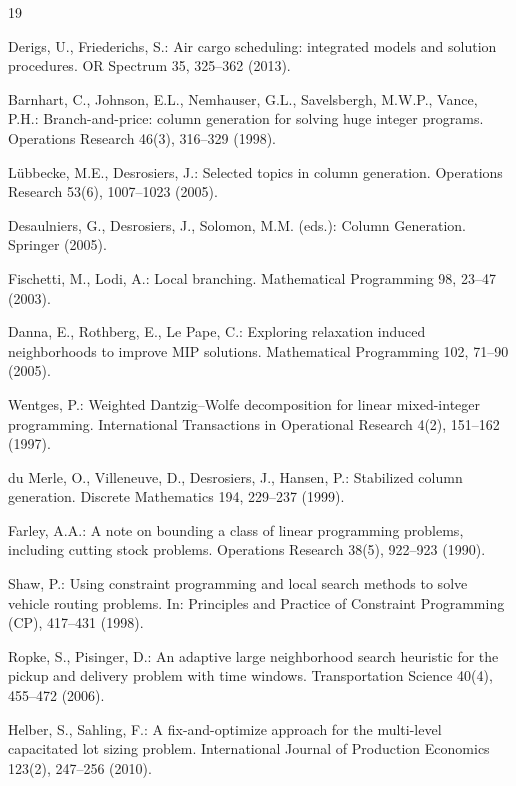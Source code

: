 \documentclass[11pt]{article}
\begin{document}
\begin{thebibliography}{19}\small

 Derigs, U., Friederichs, S.:
Air cargo scheduling: integrated models and solution procedures.
OR Spectrum 35, 325--362 (2013).

 Barnhart, C., Johnson, E.L., Nemhauser, G.L.,
Savelsbergh, M.W.P., Vance, P.H.: Branch-and-price: column generation for
solving huge integer programs. Operations Research 46(3), 316--329 (1998).

 L\"ubbecke, M.E., Desrosiers, J.: Selected topics in
column generation. Operations Research 53(6), 1007--1023 (2005).

 Desaulniers, G., Desrosiers, J., Solomon, M.M.
(eds.): Column Generation. Springer (2005).

 Fischetti, M., Lodi, A.: Local branching.
Mathematical Programming 98, 23--47 (2003).

 Danna, E., Rothberg, E., Le Pape, C.: Exploring
relaxation induced neighborhoods to improve MIP solutions. Mathematical
Programming 102, 71--90 (2005).

 Wentges, P.: Weighted Dantzig--Wolfe decomposition
for linear mixed-integer programming. International Transactions in
Operational Research 4(2), 151--162 (1997).

 du Merle, O., Villeneuve, D., Desrosiers, J., Hansen,
P.: Stabilized column generation. Discrete Mathematics 194, 229--237
(1999).

 Farley, A.A.: A note on bounding a class of linear
programming problems, including cutting stock problems. Operations
Research 38(5), 922--923 (1990).

 Shaw, P.: Using constraint programming and local search
methods to solve vehicle routing problems. In: Principles and Practice of
Constraint Programming (CP), 417--431 (1998).

 Ropke, S., Pisinger, D.: An adaptive large neighborhood
search heuristic for the pickup and delivery problem with time windows.
Transportation Science 40(4), 455--472 (2006).

 Helber, S., Sahling, F.: A fix-and-optimize approach
for the multi-level capacitated lot sizing problem. International Journal
of Production Economics 123(2), 247--256 (2010).


\end{thebibliography}
\end{document}

